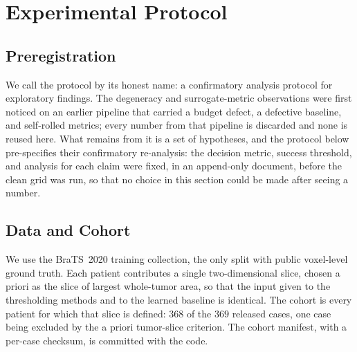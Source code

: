 %
\section{Experimental Protocol}
\label{sec:protocol}

\subsection{Preregistration}

We call the protocol by its honest name: a confirmatory analysis protocol for
exploratory findings. The degeneracy and surrogate-metric observations were first
noticed on an earlier pipeline that carried a budget defect, a defective
baseline, and self-rolled metrics; every number from that pipeline is discarded
and none is reused here. What remains from it is a set of hypotheses, and the
protocol below pre-specifies their confirmatory re-analysis: the decision metric,
success threshold, and analysis for each claim were fixed, in an append-only
document, before the clean grid was run, so that no choice in this section could
be made after seeing a number. 

\subsection{Data and Cohort}

We use the BraTS~2020 training collection, the only split with public
voxel-level ground truth. Each patient contributes a single two-dimensional
slice, chosen a priori as the slice of largest whole-tumor area, so that the
input given to the thresholding methods and to the learned baseline is identical.
The cohort is every patient for which that slice is defined: $368$ of the $369$
released cases, one case being excluded by the a priori tumor-slice criterion.
The cohort manifest, with a per-case checksum, is committed with the code.

